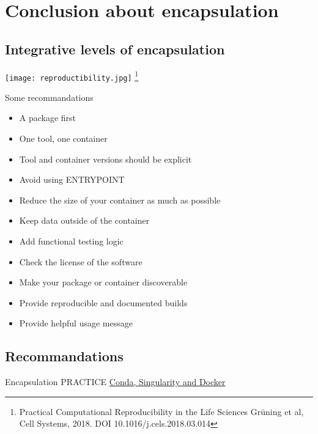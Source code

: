 \section{Conclusion about encapsulation}
\subsection{Integrative levels of encapsulation}
\begin{frame}
\centering\texttt{[image: reproductibility.jpg]} \footnote{Practical Computational Reproducibility in the Life Sciences
Grüning et al, Cell Systems, 2018. DOI 10.1016/j.cels.2018.03.014}
\end{frame}


\begin{frame}[<+->]
Some recommandations 
\begin{itemize}
\item A package first
\item One tool, one container
\item Tool and container versions should be explicit
\item Avoid using ENTRYPOINT
\item Reduce the size of your container as much as possible
\item Keep data outside of the container
\item Add functional testing logic
\item Check the license of the software
\item Make your package or container discoverable
\item Provide reproducible and documented builds
\item Provide helpful usage message
\end{itemize}
\end{frame}

\subsection{Recommandations}
\begin{frame}
\begin{block}{Encapsulation PRACTICE}
\href{https://github.com/mesocentre-clermont-auvergne/formation_fair_2022/tree/main/fair_encapsulation/encapsulation_TP}{Conda, Singularity and Docker}

\end{block}
\end{frame}
